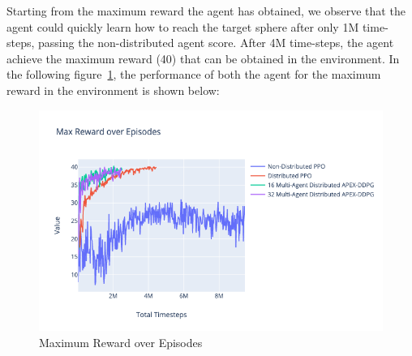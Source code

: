 Starting from the maximum reward the agent has obtained, we observe that the agent could quickly learn how to reach the target sphere after only 1M time-steps, passing the non-distributed agent score. After 4M time-steps, the agent achieve the maximum reward (40) that can be obtained in the environment. In the following figure~\ref{fig:3rd_exp_max_eps_reward}, the performance of both the agent for the maximum reward in the environment is shown below:
\begin{figure}[!htb]
		\centering
		\includegraphics[width=\linewidth]{figures/exps/3rd_exp/max_eps_reward.png}
		\caption{Maximum Reward over Episodes}
		\label{fig:3rd_exp_max_eps_reward}
\end{figure}


